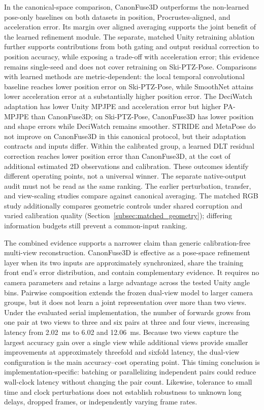 \documentclass[preprint,12pt]{elsarticle}
\begin{document}
In the canonical-space comparison, CanonFuse3D outperforms the non-learned pose-only baselines on both datasets in position, Procrustes-aligned, and acceleration error. Its margin over aligned averaging supports the joint benefit of the learned refinement module. The separate, matched Unity retraining ablation further supports contributions from both gating and output residual correction to position accuracy, while exposing a trade-off with acceleration error; this evidence remains single-seed and does not cover retraining on Ski-PTZ-Pose. Comparisons with learned methods are metric-dependent: the local temporal convolutional baseline reaches lower position error on Ski-PTZ-Pose, while SmoothNet attains lower acceleration error at a substantially higher position error. The DeciWatch adaptation has lower Unity MPJPE and acceleration error but higher PA-MPJPE than CanonFuse3D; on Ski-PTZ-Pose, CanonFuse3D has lower position and shape errors while DeciWatch remains smoother. STRIDE and MetaPose do not improve on CanonFuse3D in this canonical protocol, but their adaptation contracts and inputs differ. Within the calibrated group, a learned DLT residual correction reaches lower position error than CanonFuse3D, at the cost of additional estimated 2D observations and calibration. These outcomes identify different operating points, not a universal winner. The separate native-output audit must not be read as the same ranking. The earlier perturbation, transfer, and view-scaling studies compare against canonical averaging. The matched RGB study additionally compares geometric controls under shared corruption and varied calibration quality (Section~\ref{subsec:matched_geometry}); differing information budgets still prevent a common-input ranking.

The combined evidence supports a narrower claim than generic calibration-free multi-view reconstruction. CanonFuse3D is effective as a pose-space refinement layer when its two inputs are approximately synchronized, share the training front end's error distribution, and contain complementary evidence. It requires no camera parameters and retains a large advantage across the tested Unity angle bins. Pairwise composition extends the frozen dual-view model to larger camera groups, but it does not learn a joint representation over more than two views. Under the evaluated serial implementation, the number of forwards grows from one pair at two views to three and six pairs at three and four views, increasing latency from 2.02~ms to 6.02 and 12.06~ms. Because two views capture the largest accuracy gain over a single view while additional views provide smaller improvements at approximately threefold and sixfold latency, the dual-view configuration is the main accuracy--cost operating point. This timing conclusion is implementation-specific: batching or parallelizing independent pairs could reduce wall-clock latency without changing the pair count. Likewise, tolerance to small time and clock perturbations does not establish robustness to unknown long delays, dropped frames, or independently varying frame rates.
\end{document}
